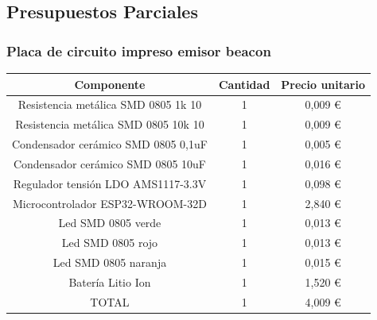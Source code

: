 \documentclass[a4paper ,12pt, onecolumn]{article}
\begin{document}
    \subsection{Presupuestos Parciales}
            \subsubsection{Placa de circuito impreso emisor beacon}
                \begin{center}
                    \begin{tabular}{||c | c |c ||} 
                    \hline
                    Componente & Cantidad & Precio unitario  \\ [0.5ex] 
                    \hline
                    Resistencia metálica SMD 0805 1k 10  	&1&	 0,009 € \\ 
                    Resistencia metálica SMD 0805 10k 10 	&1&	 0,009 € \\ 
                    Condensador cerámico SMD 0805 0,1uF  	&1&	 0,005 € \\ 
                    Condensador cerámico SMD 0805 10uF   	&1&	 0,016 € \\ 
                    Regulador tensión LDO AMS1117-3.3V   	&1&	 0,098 € \\ 
                    Microcontrolador ESP32-WROOM-32D     	&1&	 2,840 € \\ 
                    Led SMD 0805 verde                   	&1&	 0,013 € \\ 
                    Led SMD 0805 rojo                    	&1&	 0,013 € \\ 
                    Led SMD 0805 naranja                 	&1&	 0,015 € \\ 
                    Batería Litio Ion                    	&1&	 1,520 € \\ 
                    \hline
                    TOTAL                    	            &1&	 4,009 € \\ 

                \hline
                    \end{tabular}
                \end{center}
\end{document}

